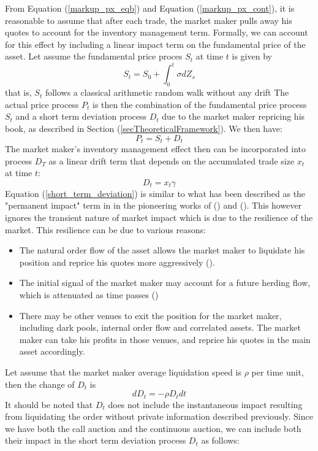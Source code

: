 \documentclass{article}
\begin{document}
From Equation (\ref{markup_px_eqb}) and Equation (\ref{markup_px_cont}), it is reasonable to assume that after each trade, the market maker pulls away his quotes to account for the inventory management term. Formally, we can account for this effect by including a linear impact term on the fundamental price of the asset. Let assume the fundamental price proces $S_t$ at time $t$ is given by
\[
  S_t = S_0 + \int_0^t \sigma dZ_s
\]
that is, $S_t$ follows a classical arithmetic random walk without any drift The actual price process $P_t$ is then the combination of the fundamental price process $S_t$ and a short term deviation process $D_t$ due to the market maker repricing his book, as described in Section (\ref{secTheoreticalFramework}). We then have:
\[
  P_t = S_t + D_t
\]
The market maker's inventory management effect then can be incorporated into process $D_T$ as a linear drift term that depends on the accumulated trade size $x_t$ at time $t$:
\begin{equation}\label{short_term_deviation}
  D_t = x_t \gamma
\end{equation}
Equation (\ref{short_term_deviation}) is similar to what has been described as the "permanent impact" term in in the pioneering works of (\cite{BertimasLo1999}) and (\cite{AlmgrenChriss2000}). This however ignores the transient nature of market impact which is due to the resilience of the market. This resilience can be due to various reasons:
\begin{itemize}
  \item The natural order flow of the asset allows the market maker to liquidate his position and reprice his quotes more aggressively (\cite{Avellaneda2008}).
  \item The initial signal of the market maker may account for a future herding flow, which is attenuated as time passes (\cite{Thibault2015})
  \item There may be other venues to exit the position for the market maker, including dark pools, internal order flow and correlated assets. The market maker can take his profits in those venues, and reprice his quotes in the main asset accordingly.
\end{itemize}
Let assume that the market maker average liquidation speed is $\rho$ per time unit, then the change of $D_t$ is
\[
  dD_t = -\rho D_t dt
\]
It should be noted that $D_t$ does not include the instantaneous impact resulting from liquidating the order without private information described previously. Since we have both the call auction and the continuous auction, we can include both their impact in the short term deviation process $D_t$ as follows:
\end{document}
